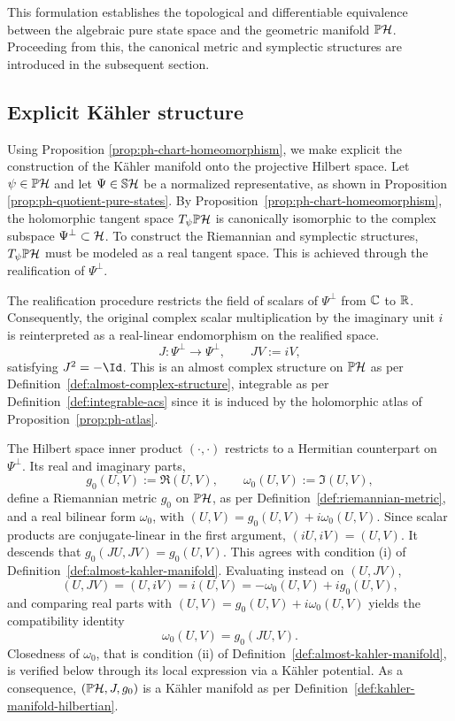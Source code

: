 \noindent This formulation establishes the topological and differentiable equivalence between the algebraic pure state space and the geometric manifold $\PH$. Proceeding from this, the canonical metric and symplectic structures are introduced in the subsequent section.

\subsection*{Explicit Kähler structure}

Using Proposition \ref{prop:ph-chart-homeomorphism}, we make explicit the construction of the Kähler manifold onto the projective Hilbert space. Let $\psi\in\PH$ and let $\Psi\in \mathbb{S}\H$ be a normalized representative, as shown in Proposition \ref{prop:ph-quotient-pure-states}. By Proposition~\ref{prop:ph-chart-homeomorphism}, the holomorphic tangent space $T_\psi\PH$ is canonically isomorphic to the complex subspace $\Psi^\perp\subset\H$. To construct the Riemannian and symplectic structures, $T_\psi\PH$ must be modeled as a real tangent space. This is achieved through the realification of $\Psi^\perp$. 

\noindent The realification procedure restricts the field of scalars of $\Psi^\perp$ from $\mathbb{C}$ to $\mathbb{R}$. Consequently, the original complex scalar multiplication by the imaginary unit $i$ is reinterpreted as a real-linear endomorphism on the realified space.
\[
J:\Psi^\perp\to\Psi^\perp,\qquad JV:=iV,
\]
satisfying $J^2=-\Id$. This is an almost complex structure on $\PH$ as per Definition~\ref{def:almost-complex-structure}, integrable as per Definition~\ref{def:integrable-acs} since it is induced by the holomorphic atlas of Proposition~\ref{prop:ph-atlas}.

\noindent The Hilbert space inner product $(\cdot,\cdot)$ restricts to a
Hermitian counterpart on $\Psi^\perp$. Its real and imaginary parts,
\begin{equation}
	g_0(U,V):=\Re(U,V), \qquad \omega_0(U,V):=\Im(U,V), \label{eq:g0-omega0}
\end{equation}
define a Riemannian metric $g_0$ on $\PH$, as per
Definition~\ref{def:riemannian-metric}, and a real bilinear form
$\omega_0$, with $(U,V)=g_0(U,V)+i\omega_0(U,V)$. Since scalar products are
conjugate-linear in the first argument, $(iU,iV)=(U,V)$. It descends that
$g_0(JU,JV)=g_0(U,V)$. This agrees with condition (i) of Definition~\ref{def:almost-kahler-manifold}. Evaluating instead on $(U,JV)$,
\[
(U,JV)=(U,iV)=i(U,V)=-\omega_0(U,V)+ig_0(U,V),
\]
and comparing real parts with $(U,V)=g_0(U,V)+i\omega_0(U,V)$ yields the
compatibility identity
\begin{equation}
	\omega_0(U,V)=g_0(JU,V). \label{eq:GJomega-ph}
\end{equation}
Closedness of $\omega_0$, that is condition (ii) of
Definition~\ref{def:almost-kahler-manifold}, is verified below through
its local expression via a Kähler potential. As a consequence, $(\PH,J,g_0)$ is a Kähler manifold as per Definition~\ref{def:kahler-manifold-hilbertian}. 

